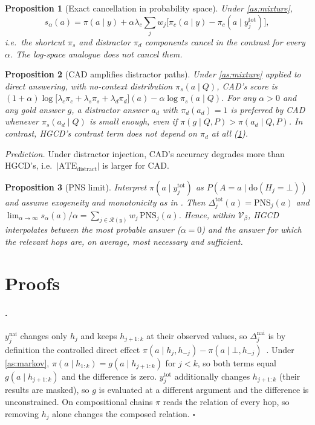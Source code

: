 \documentclass[11pt]{article}
\newtheorem{proposition}{Proposition}
\newcommand{\pa}{\pi}
\newcommand{\dotot}[1]{y^{\mathrm{tot}}_{#1}}
\newcommand{\donai}[1]{y^{\mathrm{nai}}_{#1}}
\newcommand{\Rel}{\mathcal{R}}
\newcommand{\hgcd}{\textsc{HGCD}}
\begin{document}
\begin{proposition}[Exact cancellation in probability space]\label{prop:mixture}
Under \cref{as:mixture},
\[
s_\alpha(a)=\pa(a\mid y)+\alpha\lambda_c\sum_j w_j\big[\pa_c(a\mid y)-\pa_c(a\mid\dotot{j})\big],
\]
i.e.\ the shortcut $\pa_s$ and distractor $\pa_d$ components cancel in the contrast for every
$\alpha$. The log-space analogue does not cancel them.
\end{proposition}

\begin{proposition}[CAD amplifies distractor paths]\label{prop:cad}
Under \cref{as:mixture} applied to direct answering, with no-context distribution $\pa_s(a\mid Q)$,
CAD's score is $(1{+}\alpha)\log\big[\lambda_c\pa_c+\lambda_s\pa_s+\lambda_d\pa_d\big](a)-
\alpha\log\pa_s(a\mid Q)$. For any $\alpha>0$ and any gold answer $g$, a distractor answer $a_d$ with
$\pa_d(a_d)=1$ is preferred by CAD whenever $\pa_s(a_d\mid Q)$ is small enough, even if
$\pa(g\mid Q,P)>\pa(a_d\mid Q,P)$. In contrast, \hgcd{}'s contrast term does not depend on
$\pa_d$ at all (\cref{prop:mixture}).
\end{proposition}
\emph{Prediction.} Under distractor injection, CAD's accuracy degrades more than \hgcd{}'s, i.e.\
$|\mathrm{ATE}_{\mathrm{distract}}|$ is larger for CAD.

\begin{proposition}[PNS limit]\label{prop:pns}
Interpret $\pa(a\mid\dotot{j})$ as $P(A{=}a\mid\mathrm{do}(H_j{=}\bot))$ and assume exogeneity and
monotonicity as in \citet{yu2025pns}. Then $\Delta^{\mathrm{tot}}_j(a)=\mathrm{PNS}_j(a)$ and
$\lim_{\alpha\to\infty}s_\alpha(a)/\alpha=\sum_{j\in\Rel(y)}w_j\,\mathrm{PNS}_j(a)$. Hence, within
$\mathcal{V}_\beta$, \hgcd{} interpolates between the most probable answer ($\alpha{=}0$) and the
answer for which the relevant hops are, on average, most necessary and sufficient.
\end{proposition}

\section{Proofs}
\label{app:proofs}

\paragraph{.} $\donai{j}$ changes only $h_j$ and keeps $h_{j+1:k}$ at their
observed values, so $\Delta^{\mathrm{nai}}_j$ is by definition the controlled direct effect
$\pa(a\mid h_j,h_{-j})-\pa(a\mid\bot,h_{-j})$~\citep{pearl2001direct}. Under \cref{as:markov},
$\pa(a\mid h_{1:k})=g(a\mid h_{j+1:k})$ for $j<k$, so both terms equal $g(a\mid h_{j+1:k})$ and the
difference is zero. $\dotot{j}$ additionally changes $h_{j+1:k}$ (their results are masked), so
$g$ is evaluated at a different argument and the difference is unconstrained. On compositional
chains $\pa$ reads the relation of every hop, so removing $h_j$ alone changes the composed relation.
$\square$
\end{document}

